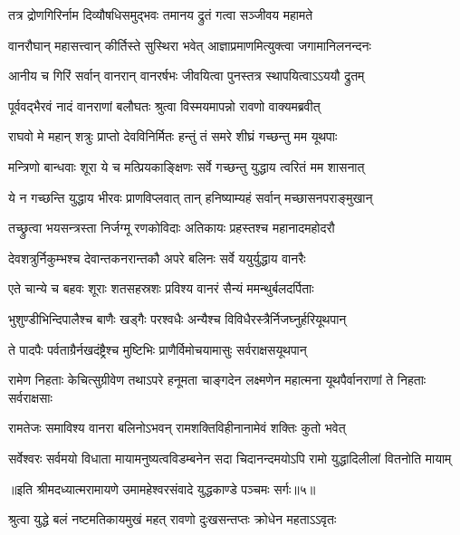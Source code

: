 \twolineshloka
{तत्र द्रोणगिरिर्नाम दिव्यौषधिसमुद्भवः}
{तमानय द्रुतं गत्वा सञ्जीवय महामते} %

\twolineshloka
{वानरौघान् महासत्त्वान् कीर्तिस्ते सुस्थिरा भवेत्}
{आज्ञाप्रमाणमित्युक्त्वा जगामानिलनन्दनः} %

\twolineshloka
{आनीय च गिरिं सर्वान् वानरान् वानरर्षभः}
{जीवयित्वा पुनस्तत्र स्थापयित्वाऽऽययौ द्रुतम्} %

\twolineshloka
{पूर्ववद्भैरवं नादं वानराणां बलौघतः}
{श्रुत्वा विस्मयमापन्नो रावणो वाक्यमब्रवीत्} %

\twolineshloka
{राघवो मे महान् शत्रुः प्राप्तो देवविनिर्मितः}
{हन्तुं तं समरे शीघ्रं गच्छन्तु मम यूथपाः} %

\twolineshloka
{मन्त्रिणो बान्धवाः शूरा ये च मत्प्रियकाङ्क्षिणः}
{सर्वे गच्छन्तु युद्धाय त्वरितं मम शासनात्} %

\twolineshloka
{ये न गच्छन्ति युद्धाय भीरवः प्राणविप्लवात्}
{तान् हनिष्याम्यहं सर्वान् मच्छासनपराङ्मुखान्} %

\twolineshloka
{तच्छ्रुत्वा भयसन्त्रस्ता निर्जग्मू रणकोविदाः}
{अतिकायः प्रहस्तश्च महानादमहोदरौ} %

\twolineshloka
{देवशत्रुर्निकुम्भश्च देवान्तकनरान्तकौ}
{अपरे बलिनः सर्वे ययुर्युद्धाय वानरैः} %

\twolineshloka
{एते चान्ये च बहवः शूराः शतसहस्रशः}
{प्रविश्य वानरं सैन्यं ममन्थुर्बलदर्पिताः} %

\twolineshloka
{भुशुण्डीभिन्दिपालैश्च बाणैः खड्गैः परश्वधैः}
{अन्यैश्च विविधैरस्त्रैर्निजघ्नुर्हरियूथपान्} %

\twolineshloka
{ते पादपैः पर्वताग्रैर्नखदंष्ट्रैश्च मुष्टिभिः}
{प्राणैर्विमोचयामासुः सर्वराक्षसयूथपान्} %

\threelineshloka
{रामेण निहताः केचित्सुग्रीवेण तथाऽपरे}
{हनूमता चाङ्गदेन लक्ष्मणेन महात्मना}
{यूथपैर्वानराणां ते निहताः सर्वराक्षसाः} %

\twolineshloka
{रामतेजः समाविश्य वानरा बलिनोऽभवन्}
{रामशक्तिविहीनानामेवं शक्तिः कुतो भवेत्} %

\fourlineindentedshloka
{सर्वेश्वरः सर्वमयो विधाता}
{मायामनुष्यत्वविडम्बनेन}
{सदा चिदानन्दमयोऽपि रामो}
{युद्धादिलीलां वितनोति मायाम्} %

{॥इति श्रीमदध्यात्मरामायणे उमामहेश्वरसंवादे युद्धकाण्डे
पञ्चमः सर्गः॥५॥
}





\twolineshloka
{श्रुत्वा युद्धे बलं नष्टमतिकायमुखं महत्}
{रावणो दुःखसन्तप्तः क्रोधेन महताऽऽवृतः} %

